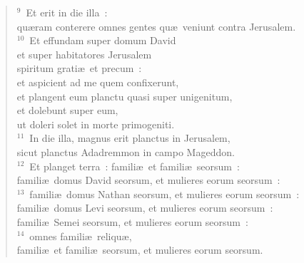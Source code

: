 \begin{flushleft}\begin{verse}${}^{9}$~Et erit in die illa~:\\ qu\ae ram conterere omnes gentes qu\ae\ veniunt contra Jerusalem.\\
${}^{10}$~Et effundam super domum David\\ et super habitatores Jerusalem\\ spiritum grati\ae\ et precum~:\\ et aspicient ad me quem confixerunt,\\ et plangent eum planctu quasi super unigenitum,\\ et dolebunt super eum,\\ ut doleri solet in morte primogeniti.\\
${}^{11}$~In die illa, magnus erit planctus in Jerusalem,\\ sicut planctus Adadremmon in campo Mageddon.\\
${}^{12}$~Et planget terra~: famili\ae\ et famili\ae\ seorsum~:\\ famili\ae\ domus David seorsum, et mulieres eorum seorsum~:\\
${}^{13}$~famili\ae\ domus Nathan seorsum, et mulieres eorum seorsum~:\\ famili\ae\ domus Levi seorsum, et mulieres eorum seorsum~:\\ famili\ae\ Semei seorsum, et mulieres eorum seorsum~:\\
${}^{14}$~omnes famili\ae\ reliqu\ae ,\\ famili\ae\ et famili\ae\ seorsum, et mulieres eorum seorsum.\end{verse}\end{flushleft}


